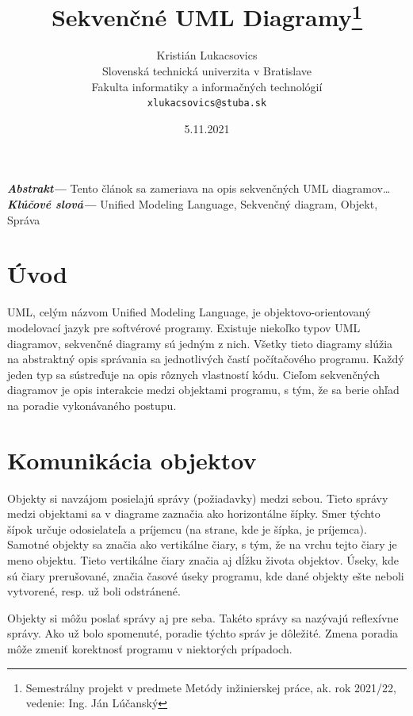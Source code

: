 \documentclass[10pt,twoside,slovak,a4paper]{article}
\title{Sekvenčné UML Diagramy\thanks{Semestrálny projekt v predmete Metódy inžinierskej práce, ak. rok 2021/22, vedenie: Ing. Ján Lúčanský}}
\author{Kristián Lukacsovics\\[2pt]
    {\small Slovenská technická univerzita v Bratislave}\\
    {\small Fakulta informatiky a informačných technológií}\\
    {\small \texttt{xlukacsovics@stuba.sk}}
    }
\date{\small 5.11.2021} %
\providecommand{\abstr}[1]{\textbf{\textit{Abstrakt---}} #1}
\providecommand{\keywords}[1]{\textbf{\textit{Klúčové slová---}} #1}
\begin{document}
\maketitle

\abstr{Tento článok sa zameriava na opis sekvenčných UML diagramov\ldots\newline}
\indent\keywords{Unified Modeling Language, Sekvenčný diagram, Objekt, Správa}

\section{Úvod}
UML, celým názvom Unified Modeling Language, je objektovo-orientovaný modelovací jazyk pre softvérové programy. \cite{eriksson98}
Existuje niekoľko typov UML diagramov, sekvenčné diagramy sú jedným z nich. Všetky tieto diagramy slúžia na
abstraktný opis správania sa jednotlivých častí počítačového programu. Každý jeden typ sa sústreďuje na opis
rôznych vlastností kódu. Cieľom sekvenčných diagramov je opis interakcie medzi objektami programu, s tým, že sa
berie ohľad na poradie vykonávaného postupu. \cite{petraq14}

\section{Komunikácia objektov} \label{nejaka}

\noindent Objekty si navzájom posielajú správy (požiadavky) medzi sebou. Tieto
správy medzi objektami sa v diagrame zaznačia ako horizontálne šípky. Smer týchto šípok určuje odosielateľa a
príjemcu (na strane, kde je šípka, je príjemca). Samotné objekty sa značia ako vertikálne čiary, s tým, že
na vrchu tejto čiary je meno objektu. Tieto vertikálne čiary značia aj dĺžku života objektov. Úseky, kde sú
čiary prerušované, značia časové úseky programu, kde dané objekty ešte neboli vytvorené, resp. už boli odstránené. \newline

\noindent Objekty si môžu poslať správy aj pre seba. Takéto správy sa nazývajú reflexívne správy. 
Ako už bolo spomenuté, poradie týchto správ je dôležité. Zmena poradia môže zmeniť korektnosť programu
v niektorých prípadoch. \cite{petraq14}  \newline
\end{document}
